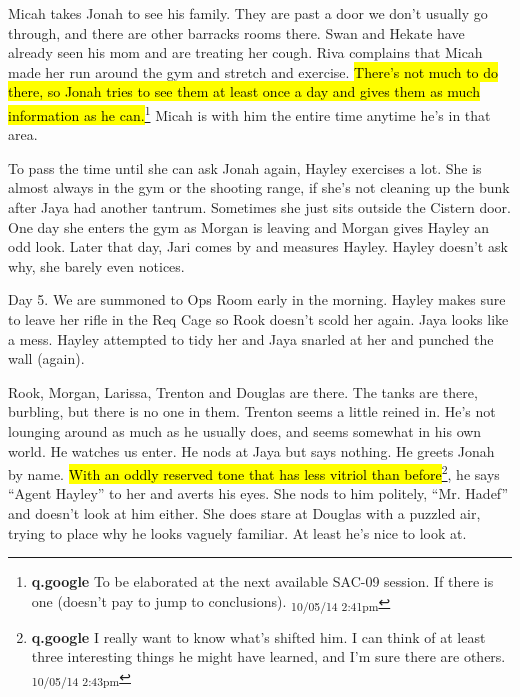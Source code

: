 \newpage
{}

Micah takes Jonah to see his family.  They are past a door we don't usually go through, and there are other barracks rooms there.  Swan and Hekate have already seen his mom and are treating her cough.  Riva complains that Micah made her run around the gym and stretch and exercise.  \hl{There's not much to do there, so Jonah tries to see them at least once a day and gives them as much information as he can.}\footnote{\textbf{q.google }To be elaborated at the next available SAC-09 session.  If there is one (doesn't pay to jump to conclusions). \textsubscript{10/05/14 2:41pm}}  Micah is with him the entire time anytime he's in that area.



To pass the time until she can ask Jonah again, Hayley exercises a lot.  She is almost always in the gym or the shooting range, if she's not cleaning up the bunk after Jaya had another tantrum.  Sometimes she just sits outside the Cistern door.  One day she enters the gym as Morgan is leaving and Morgan gives Hayley an odd look.  Later that day, Jari comes by and measures Hayley.  Hayley doesn't ask why, she barely even notices.





Day 5.  We are summoned to Ops Room early in the morning.  Hayley makes sure to leave her rifle in the Req Cage so Rook doesn't scold her again.  Jaya looks like a mess. Hayley attempted to tidy her and Jaya snarled at her and punched the wall (again). 



Rook, Morgan, Larissa, Trenton and Douglas are there.  The tanks are there, burbling, but there is no one in them.  Trenton seems a little reined in.  He's not lounging around as much as he usually does, and seems somewhat in his own world.  He watches us enter.  He nods at Jaya but says nothing.  He greets Jonah by name.   \hl{With an oddly reserved tone that has less vitriol than before}\footnote{\textbf{q.google }I really want to know what's shifted him.  I can think of at least three interesting things he might have learned, and I'm sure there are others. \textsubscript{10/05/14 2:43pm}}, he says ``Agent Hayley'' to her and averts his eyes.  She nods to him politely, ``Mr. Hadef'' and doesn't look at him either.  She does stare at Douglas with a puzzled air, trying to place why he looks vaguely familiar.  At least he's nice to look at.



